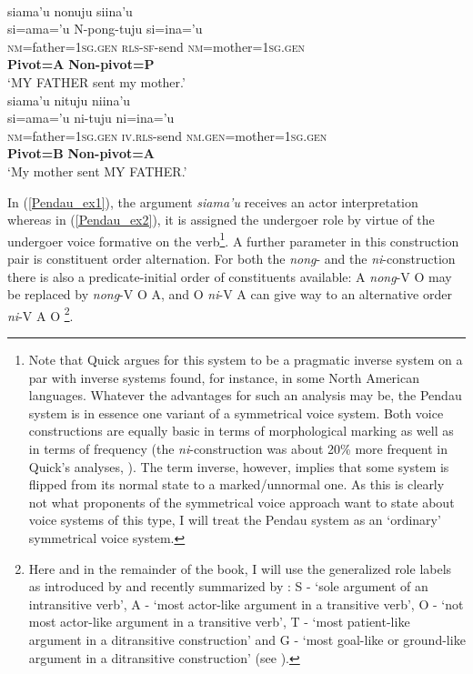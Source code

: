 \ea 
{}\\
\ea \label{Pendau_ex1}
\gllll siama'u nonuju siina'u \\
si=ama='u N-pong-tuju si=ina='u \\
 \textsc{nm}=father=\textsc{1}\textsc{sg}.\textsc{gen} \textsc{rls}-\textsc{sf}-send \textsc{nm}=mother=\textsc{1}\textsc{sg}.\textsc{gen} \\
 \textbf{Pivot=A} {} \textbf{Non-pivot=P} \\
\glft `MY FATHER sent my mother.' \\ 
\ex \label{Pendau_ex2}
\gllll siama'u nituju niina'u \\
si=ama='u ni-tuju ni=ina='u \\
 \textsc{nm}=father=\textsc{1}\textsc{sg}.\textsc{gen} \textsc{iv}.\textsc{rls}-send \textsc{nm}.\textsc{gen}=mother=\textsc{1}\textsc{sg}.\textsc{gen} \\
 \textbf{Pivot=B} {} \textbf{Non-pivot=A} \\
\glft `My mother sent MY FATHER.'\\ 
\z
\z

In (\ref{Pendau_ex1}), the argument \textit{siama'u} receives an actor interpretation whereas in (\ref{Pendau_ex2}), it is assigned the undergoer role by virtue of the undergoer voice formative on the verb\footnote{Note that Quick argues for this system to be a pragmatic inverse system on a par with inverse systems found, for instance, in some North American languages. Whatever the advantages for such an analysis may be, the Pendau system is in essence one variant of a symmetrical voice system. Both voice constructions are equally basic in terms of morphological marking as well as in terms of frequency (the \textit{ni}-construction was about 20\% more frequent in Quick's analyses, \citealt[580]{Quick2007}). The term inverse, however, implies that some system is flipped from its normal state to a marked/unnormal one. As this is clearly not what proponents of the symmetrical voice approach want to state about voice systems of this type, I will treat the Pendau system as an `ordinary' symmetrical voice system.}. A further parameter in this construction pair is constituent order alternation. For both the \textit{nong}- and the \textit{ni}-construction there is also a predicate-initial order of constituents available: A \textit{nong}-V O may be replaced by \textit{nong}-V O A, and O \textit{ni}-V A can give way to an alternative order \textit{ni}-V A O \citep[366]{Quick2007}\footnote{Here and in the remainder of the book, I will use the generalized role labels as introduced by \textcite{Dixon1979} and recently summarized by \textcite{Bickel2011}: S - `sole argument of an intransitive verb', A - `most actor-like argument in a transitive verb', O - `not most actor-like argument in a transitive verb', T - `most patient-like argument in a ditransitive construction' and G - `most goal-like or ground-like argument in a ditransitive construction' (see \citealt[402ff.]{Bickel2011}).}.

